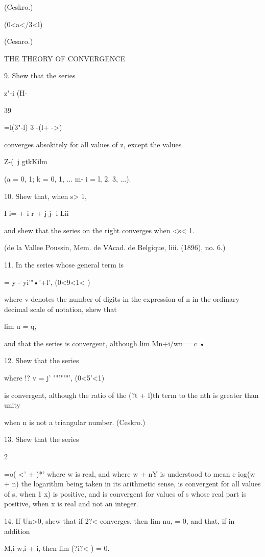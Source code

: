 (Ceskro.)

(0<a</3<l)

(Cesaro.)



THE THEORY OF CONVERGENCE

9. Shew that the series

   z"-i (H-%



39



 =l(3"-l) 3 -(l+ ->)

converges absokitely for all values of z, except the values

Z-(\ j gtkKilm

(a = 0, 1; k = 0, 1, ... m-\; i = l, 2, 3, ...).

10. Shew that, when s> 1,

I i= + i r + j-j- i Lii

and shew that the series on the right converges when <s< 1.

(de la Vallee Poussin, Mem. de VAcad. de Belgique, liii. (1896), no.
6.)

11. In the series whose general term is

   = y - yi'"•'+l', (0<9<1< )

where v denotes the number of digits in the expression of n in the
ordinary decimal scale of notation, shew that

lim u = q,

and that the series is convergent, although lim Mn+i/wn==c •

12. Shew that the series

where !? v = j' ""'"""', (0<5'<1)

is convergent, although the ratio of the (?t + l)th term to the nth is
greater than unity

when n is not a triangular number. (Ceskro.)

13. Shew that the series

2

 =o( <' + )*' where w is real, and where w + nY is understood to mean
e iog(w + n) the logarithm being taken in its arithmetic sense, is
convergent for all values of s, when 1 x) is positive, and is
convergent for values of s whose real part is positive, when x is real
and not an integer.

14. If Un>0, shew that if 2?< converges, then lim nu, = 0, and that,
if in addition

M,i w,i + i, then lim (?i?< ) = 0.



